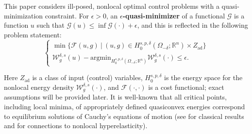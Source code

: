 \documentclass[11pt, reqno]{amsart}   	%
\theoremstyle{plain}
\numberwithin{equation}{section}
\def\de{\delta}
\def\ep{\epsilon}
\def\Om{\Omega}
\def\R{\mathbb{R}}
\def\argmin{\text{argmin}}
\begin{document}


This paper considers ill-posed, nonlocal optimal control problems with a quasi-minimization constraint. For $\ep > 0$, an \textbf{$\ep$-quasi-minimizer} of a functional $\mathcal{G}$ is a function $u$ such that $\mathcal{G}(u) \leq \inf \mathcal{G}(\cdot) + \ep$, and this is reflected in the following problem statement:
        	\begin{equation}\label{Eq: genericQuasiMins}
		\begin{cases}
			\min\{\mathcal{F}(u, g) \ | \  (u, g) \in H^{s, p, \de}_0(\Om_{-\de}; \R^n) \times Z_{\text{ad}}\} \\
			\mathcal{W}^{\de, s}_g(u) - \argmin_{H^{s, p, \de}_0(\Om_{-\de}; \R^n)}\mathcal{W}^{\de, s}_g(\cdot) \leq \ep.
		\end{cases}
	\end{equation}

    Here $Z_{\text{ad}}$ is a class of input (control) variables, $H^{s, p, \de}_0$ is the energy space for the nonlocal energy density $\mathcal{W}^{\de, s}_g(\cdot)$, and $\mathcal{F}(\cdot, \cdot)$ is a cost functional; exact assumptions will be provided later. It is well-known that all critical points, including local minima, of appropriately defined quasiconvex energies  correspond to equilibrium solutions of Cauchy's equations of motion (see \cite{cauchy1828exercices, green1967formulation} for classical results and \cite{bellido2020bond} for connections to nonlocal hyperelasticity). 

\end{document}
